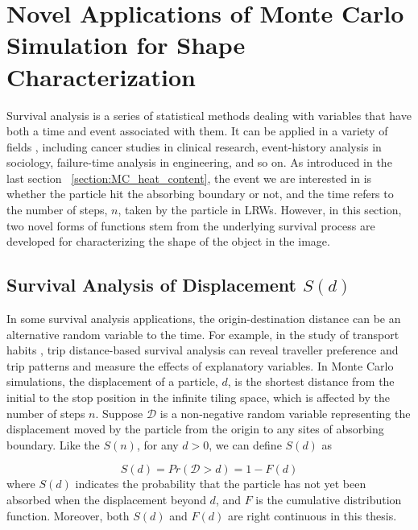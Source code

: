 

\section{Novel Applications of Monte Carlo Simulation for Shape Characterization}

Survival analysis is a series of statistical methods dealing with
variables that have both a time and event associated with them. It can
be applied in a variety of fields \cite{clark2003survival}, including
cancer studies in clinical research, event-history analysis in
sociology, failure-time analysis in engineering, and so on. As
introduced in the last section ~\ref{section:MC_heat_content}, the
event we are interested in is whether the particle hit the absorbing
boundary or not, and the time refers to the number of steps, $n$,
taken by the particle in LRWs. However, in this section, two novel
forms of functions stem from the underlying survival process are
developed for characterizing the shape of the object in the image.


\subsection{Survival Analysis of Displacement $S(d)$}

In some survival analysis applications, the origin-destination
distance can be an alternative random variable to the time. For
example, in the study of transport habits
\cite{anastasopoulos2017transport} \cite{su12166331}, trip
distance-based survival analysis can reveal traveller preference and
trip patterns and measure the effects of explanatory variables. In
Monte Carlo simulations, the displacement of a particle, $d$, is the
shortest distance from the initial to the stop position in the
infinite tiling space, which is affected by the number of steps
$n$. Suppose $\mathcal{D}$ is a non-negative random variable
representing the displacement moved by the particle from the origin to
any sites of absorbing boundary. Like the $S(n)$, for any $d>0$, we
can define $S(d)$ as

\begin{equation}\label{eq:sf_disp}
  S(d) = Pr(\mathcal{D} > d) = 1 - F(d)
\end{equation}
where $S(d)$ indicates the probability that the particle has not yet
been absorbed when the displacement beyond $d$, and $F$ is the
cumulative distribution function. Moreover, both $S(d)$ and $F(d)$ are
right continuous in this thesis.

